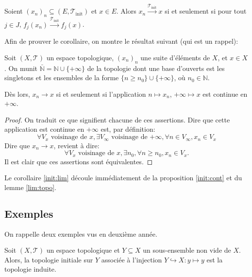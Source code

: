 \begin{cor}\label{init:lim}
  Soient $(x_n)_n\subseteq (E, \mathcal{T}_{\mathrm{init}})$ et $x\in E$.
  Alors $x_n\xrightarrow{\mathcal{T}_{\mathrm{init}}} x$ si et seulement
  si pour tout $j\in J$, $f_j(x_n)\xrightarrow{\mathcal{T}_{\mathrm{init}}} f_j(x)$.
\end{cor}

Afin de prouver le corollaire, on montre le résultat suivant (qui
est un rappel):
\begin{lem}\label{lim:topo}
  Soit $(X, \mathcal{T})$ un espace topologique, $(x_n)_n$ une
  suite d'éléments de $X$, et $x\in X$. On munit $\bar{\mathbb{N}}=%
  \mathbb{N}\cup\{+\infty\}$ de la topologie dont une base d'ouverts
  est les singletons et les ensembles de la forme
  $\{n\geq n_0\}\cup\{+\infty\}$, où $n_0\in\mathbb N$.

  Dès lors, $x_n\to x$ si et seulement si l'application
  $n\mapsto x_n$, $+\infty\mapsto x$ est continue en $+\infty$.
\end{lem}

\begin{proof}
  On traduit ce que signifient chacune de ces assertions.
  Dire que cette application est continue en $+\infty$ est,
  par définition:
  \begin{equation*}
    \forall V_x\mbox{ voisinage de $x$},
    \exists V_\infty \mbox{ voisinage de $+\infty$},
    \forall n\in V_\infty, x_n\in V_x
  \end{equation*}
  Dire que $x_n\to x$, revient à dire:
  \begin{equation*}
    \forall V_x \mbox{ voisinage de $x$}, \exists n_0,
    \forall n\geq n_0, x_n\in V_x.
  \end{equation*}
  Il est clair que ces assertions sont équivalentes.
\end{proof}

Le corollaire \ref{init:lim} découle immédiatement de la proposition
\ref{init:cont} et du lemme \ref{lim:topo}.

\subsection*{Exemples}
On rappelle deux exemples vus en deuxième année.
\begin{ex}
  Soit $(X, \mathcal{T})$ un espace topologique et $Y\subseteq X$ un
  sous-ensemble non vide de $X$. Alors, la topologie initiale sur $Y$
  associée à l'injection $Y\hookrightarrow X: y\mapsto y$ est la topologie
  induite.
\end{ex}

